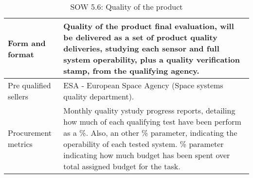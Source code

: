\begin{table}[H]
\begin{tabular}{>{\raggedright\arraybackslash}p{3cm} >{\arraybackslash}p{11cm}}
		Form and format & Quality of the product final evaluation, will be delivered as a set of product quality deliveries, studying each sensor and full system operability, plus a quality verification stamp, from the qualifying agency.   \vspace{0.2cm} \\
		
		\midrule
		
		Pre qualified sellers & ESA - European Space Agency (Space systems quality department).\vspace{0.2cm} \\
		
		\midrule
		
		Procurement metrics & Monthly quality ystudy progress reports, detailing how much of each qualifying test have been perform as a \%. Also, an other \% parameter, indicating the operability of each tested system. \% parameter indicating how much budget has been spent over total assigned budget for the task.\vspace{0.2cm} \\
		
		\bottomrule[2pt]		
		
	\end{tabular}
	\caption{SOW 5.6: Quality of the product}
\end{table}


